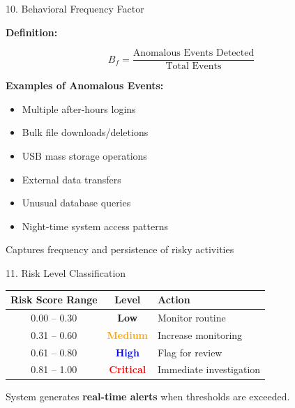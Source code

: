 \documentclass[aspectratio=169]{beamer}
\begin{document}
\begin{frame}{10. Behavioral Frequency Factor}

\textbf{Definition:}

\[
B_f = \frac{\text{Anomalous Events Detected}}{\text{Total Events}}
\]

\vspace{0.3cm}

\textbf{Examples of Anomalous Events:}
\begin{itemize}
    \item Multiple after-hours logins
    \item Bulk file downloads/deletions
    \item USB mass storage operations
    \item External data transfers
    \item Unusual database queries
    \item Night-time system access patterns
\end{itemize}

\vspace{0.3cm}

Captures frequency and persistence of risky activities

\end{frame}

\begin{frame}{11. Risk Level Classification}

\begin{table}
\centering
\renewcommand{\arraystretch}{1.5}
\begin{tabular}{|c|c|l|}
\hline
\textbf{Risk Score Range} & \textbf{Level} & \textbf{Action} \\
\hline
0.00 – 0.30 & \textcolor{green!70!black}{\textbf{Low}} & Monitor routine \\
\hline
0.31 – 0.60 & \textcolor{orange}{\textbf{Medium}} & Increase monitoring \\
\hline
0.61 – 0.80 & \textcolor{blue}{\textbf{High}} & Flag for review \\
\hline
0.81 – 1.00 & \textcolor{red}{\textbf{Critical}} & Immediate investigation \\
\hline
\end{tabular}
\end{table}

\vspace{0.5cm}
System generates \textbf{real-time alerts} when thresholds are exceeded.

\end{frame}
\end{document}
